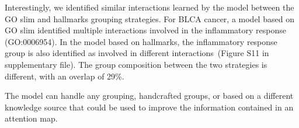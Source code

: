 \documentclass[../main.tex]{subfiles}
\begin{document}
Interestingly, we identified similar interactions learned by the model between the GO slim and hallmarks grouping strategies.
For BLCA cancer, a model based on GO slim identified multiple interactions involved in the inflammatory response (GO:0006954).
In the model based on hallmarks, the inflammatory response group is also identified as involved in different interactions~(Figure S11 in supplementary file).
The group composition between the two strategies is different, with an overlap of 29\%.


The model can handle any grouping, handcrafted groups, or based on a different knowledge source that could be used to improve the information contained in an attention map.
\end{document}
